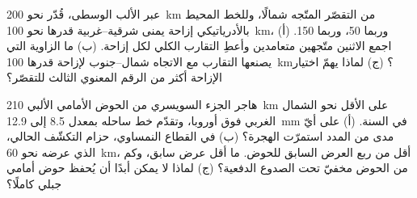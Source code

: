 \begin{exercise}[$\star\star\star$]\label{exo:b2:alpine-orogen:11}
عبر الألب الوسطى، قُدّر نحو \qty{200}{km} من التقصّر المتّجه شمالًا،
وللخط المحيط بالأدرياتيكي إزاحة يمنى شرقية--غربية قدرها نحو
\qty{100}{km}، وربما 50، وربما 150. (أ) اجمع الاثنين متّجهين متعامدين وأعطِ
التقارب الكلي لكل إزاحة. (ب) ما الزاوية التي يصنعها التقارب مع
الاتجاه شمال--جنوب لإزاحة قدرها \qty{100}{km}؟ (ج) لماذا يهمّ اختيار الإزاحة
أكثر من الرقم المعنوي الثالث للتقصّر؟
\end{exercise}

\begin{exercise}[$\star\star\star$]\label{exo:b2:alpine-orogen:12}
هاجر الجزء السويسري من الحوض الأمامي الألبي \qty{210}{km} على الأقل نحو الشمال الغربي
فوق أوروبا، وتقدّم خط ساحله بمعدل 8.5 إلى \qty{12.9}{mm} في السنة. (أ) على أيّ مدى من
المدد استمرّت الهجرة؟ (ب) في القطاع النمساوي، حزام التكشّف الحالي،
الذي عرضه نحو \qty{60}{km}، أقل من ربع العرض السابق للحوض. ما أقل
عرض سابق، وكم من الحوض مخفيّ تحت الصدوع الدفعية؟ (ج) لماذا لا يمكن أبدًا أن يُحفظ
حوض أمامي جبلي كاملًا؟
\end{exercise}

